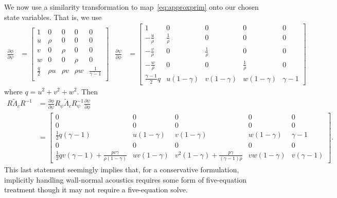 \documentclass[letterpaper,11pt,nointlimits,reqno]{amsart}
\begin{document}
We now use a similarity transformation to map~\eqref{eq:approxprim} onto our
chosen state variables.  That is, we use
\begin{align}
  \frac{\partial \phi}{\partial \psi}
  &=
 \begin{bmatrix}
  1                      & 0      & 0      & 0      &  0                  \\
  u                      & \rho   & 0      & 0      &  0                  \\
  v                      & 0      & \rho   & 0      &  0                  \\
  w                      & 0      & 0      & \rho   &  0                  \\
  \frac{q}{2}  & \rho u & \rho v & \rho w &  \frac{1}{\gamma-1} \\
 \end{bmatrix}
&
  \frac{\partial \psi}{\partial \phi}
  &=
 \begin{bmatrix}
 1 & 0 & 0 & 0 & 0 \\
 -\frac{u}{\rho } & \frac{1}{\rho } & 0 & 0 & 0 \\
 -\frac{v}{\rho } & 0 & \frac{1}{\rho } & 0 & 0 \\
 -\frac{w}{\rho } & 0 & 0 & \frac{1}{\rho } & 0 \\
 \frac{\gamma-1}{2} q  & u(1-\gamma) & v(1-\gamma) & w(1-\gamma) & \gamma-1
 \end{bmatrix}
\end{align}
where $q=u^2+v^2+w^2$.  Then
\begin{align}
  R \tilde\Lambda_c R^{-1}
  &=
  \frac{\partial \phi}{\partial \psi}
  R_\psi \tilde\Lambda_c R_\psi^{-1}
  \frac{\partial \psi}{\partial \phi}
\\
 &=
\begin{bmatrix}
 0 & 0 & 0 & 0 & 0 \\
 0 & 0 & 0 & 0 & 0 \\
 \frac{1}{2} q (\gamma-1) & u(1-\gamma)  & v(1-\gamma)  & w(1-\gamma)  & \gamma-1  \\
 0 & 0 & 0 & 0 & 0 \\
 \frac{1}{2} q v (\gamma-1 )+\frac{p v \gamma }{\rho(1-\gamma) } & u v (1-\gamma ) & v^2 (1-\gamma )+\frac{p \gamma }{(\gamma-1) \rho } & v w (1-\gamma ) & v (\gamma-1 )
\end{bmatrix}
.
\end{align}
This last statement seemingly implies that, for a conservative formulation,
implicitly handling wall-normal acoustics requires some form of five-equation
treatment though it may not require a five-equation solve.
\end{document}
